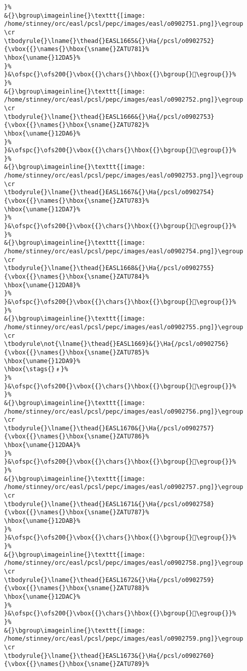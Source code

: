 \begin{verbatim}
}%
&{}\bgroup\imageinline{}\texttt{[image: /home/stinney/orc/easl/pcsl/pepc/images/easl/o0902751.png]}\egroup
\cr
\tbodyrule{}\lname{}\thead{}EASL1665&{}\Ha{/pcsl/o0902752}{\vbox{{}\names{}\hbox{\sname{}ZATU781}%
\hbox{\uname{}12DA5}%
}%
}&\ofspc{}\ofs200{}\vbox{{}\chars{}\hbox{{}\bgroup{}𒶥\egroup{}}%
}%
&{}\bgroup\imageinline{}\texttt{[image: /home/stinney/orc/easl/pcsl/pepc/images/easl/o0902752.png]}\egroup
\cr
\tbodyrule{}\lname{}\thead{}EASL1666&{}\Ha{/pcsl/o0902753}{\vbox{{}\names{}\hbox{\sname{}ZATU782}%
\hbox{\uname{}12DA6}%
}%
}&\ofspc{}\ofs200{}\vbox{{}\chars{}\hbox{{}\bgroup{}𒶦\egroup{}}%
}%
&{}\bgroup\imageinline{}\texttt{[image: /home/stinney/orc/easl/pcsl/pepc/images/easl/o0902753.png]}\egroup
\cr
\tbodyrule{}\lname{}\thead{}EASL1667&{}\Ha{/pcsl/o0902754}{\vbox{{}\names{}\hbox{\sname{}ZATU783}%
\hbox{\uname{}12DA7}%
}%
}&\ofspc{}\ofs200{}\vbox{{}\chars{}\hbox{{}\bgroup{}𒶧\egroup{}}%
}%
&{}\bgroup\imageinline{}\texttt{[image: /home/stinney/orc/easl/pcsl/pepc/images/easl/o0902754.png]}\egroup
\cr
\tbodyrule{}\lname{}\thead{}EASL1668&{}\Ha{/pcsl/o0902755}{\vbox{{}\names{}\hbox{\sname{}ZATU784}%
\hbox{\uname{}12DA8}%
}%
}&\ofspc{}\ofs200{}\vbox{{}\chars{}\hbox{{}\bgroup{}𒶨\egroup{}}%
}%
&{}\bgroup\imageinline{}\texttt{[image: /home/stinney/orc/easl/pcsl/pepc/images/easl/o0902755.png]}\egroup
\cr
\tbodyrule\not{\lname{}\thead{}EASL1669}&{}\Ha{/pcsl/o0902756}{\vbox{{}\names{}\hbox{\sname{}ZATU785}%
\hbox{\uname{}12DA9}%
\hbox{\stags{}﹟}%
}%
}&\ofspc{}\ofs200{}\vbox{{}\chars{}\hbox{{}\bgroup{}𒶩\egroup{}}%
}%
&{}\bgroup\imageinline{}\texttt{[image: /home/stinney/orc/easl/pcsl/pepc/images/easl/o0902756.png]}\egroup
\cr
\tbodyrule{}\lname{}\thead{}EASL1670&{}\Ha{/pcsl/o0902757}{\vbox{{}\names{}\hbox{\sname{}ZATU786}%
\hbox{\uname{}12DAA}%
}%
}&\ofspc{}\ofs200{}\vbox{{}\chars{}\hbox{{}\bgroup{}𒶪\egroup{}}%
}%
&{}\bgroup\imageinline{}\texttt{[image: /home/stinney/orc/easl/pcsl/pepc/images/easl/o0902757.png]}\egroup
\cr
\tbodyrule{}\lname{}\thead{}EASL1671&{}\Ha{/pcsl/o0902758}{\vbox{{}\names{}\hbox{\sname{}ZATU787}%
\hbox{\uname{}12DAB}%
}%
}&\ofspc{}\ofs200{}\vbox{{}\chars{}\hbox{{}\bgroup{}𒶫\egroup{}}%
}%
&{}\bgroup\imageinline{}\texttt{[image: /home/stinney/orc/easl/pcsl/pepc/images/easl/o0902758.png]}\egroup
\cr
\tbodyrule{}\lname{}\thead{}EASL1672&{}\Ha{/pcsl/o0902759}{\vbox{{}\names{}\hbox{\sname{}ZATU788}%
\hbox{\uname{}12DAC}%
}%
}&\ofspc{}\ofs200{}\vbox{{}\chars{}\hbox{{}\bgroup{}𒶬\egroup{}}%
}%
&{}\bgroup\imageinline{}\texttt{[image: /home/stinney/orc/easl/pcsl/pepc/images/easl/o0902759.png]}\egroup
\cr
\tbodyrule{}\lname{}\thead{}EASL1673&{}\Ha{/pcsl/o0902760}{\vbox{{}\names{}\hbox{\sname{}ZATU789}%

\end{verbatim}
